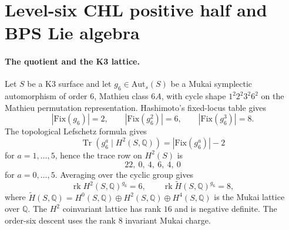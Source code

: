 \providecommand{\bC}{\mathbb{C}}
\providecommand{\bZ}{\mathbb{Z}}
\providecommand{\bQ}{\mathbb{Q}}
\providecommand{\Aut}{\mathrm{Aut}}
\providecommand{\Auts}{\mathrm{Aut}_s}
\providecommand{\Fix}{\mathrm{Fix}}
\providecommand{\CoHA}{\mathrm{CoHA}}
\providecommand{\Coh}{\mathrm{Coh}}
\providecommand{\DT}{\mathrm{DT}}
\providecommand{\red}{\mathrm{red}}
\providecommand{\BPS}{\mathrm{BPS}}
\providecommand{\eff}{\mathrm{eff}}
\providecommand{\cO}{\mathcal{O}}
\providecommand{\cA}{\mathcal{A}}
\providecommand{\cM}{\mathcal{M}}
\providecommand{\fg}{\mathfrak{g}}
\providecommand{\fn}{\mathfrak{n}}
\providecommand{\Teq}{T_{\mathrm{eq}}}
\providecommand{\Eone}{E_1}
\providecommand{\Etwo}{E_2}
\providecommand{\Yp}{Y^{+}}
\providecommand{\DTred}{Z^{\mathrm{red}}_{\mathrm{DT}}}
\providecommand{\Hall}{\mathrm{Hall}}
\providecommand{\wt}{\mathrm{wt}}
\providecommand{\sdim}{\operatorname{sdim}}
\providecommand{\kch}{\kappa_{\mathrm{ch}}}
\providecommand{\kBKM}{\kappa_{\mathrm{BKM}}}
\providecommand{\kcat}{\kappa_{\mathrm{cat}}}
\providecommand{\kfib}{\kappa_{\mathrm{fiber}}}
\providecommand{\DeltaCHLSix}{\Delta_{1}^{(6)}}

\section*{Level-six CHL positive half and BPS Lie algebra}
\label{n6:sec:positive-half-BPS}

\paragraph{The quotient and the K3 lattice.}
Let $S$ be a K3 surface and let
$g_6\in\Auts(S)$ be a Mukai symplectic automorphism of order $6$,
Mathieu class $6A$, with cycle shape $1^2 2^2 3^2 6^2$ on the
Mathieu permutation representation. Hashimoto's fixed-locus table gives
\[
  |\Fix(g_6)|=2,\qquad
  |\Fix(g_6^2)|=6,\qquad
  |\Fix(g_6^3)|=8 .
\]
The topological Lefschetz formula gives
\[
  \operatorname{Tr}(g_6^a\mid H^2(S,\bQ))
  =
  |\Fix(g_6^a)|-2
\]
for $a=1,\ldots,5$, hence the trace row on $H^2(S)$ is
\[
  22,\ 0,\ 4,\ 6,\ 4,\ 0
\]
for $a=0,\ldots,5$. Averaging over the cyclic group gives
\[
  \operatorname{rk}H^2(S,\bQ)^{g_6}=6,\qquad
  \operatorname{rk}\widetilde H(S,\bQ)^{g_6}=8,
\]
where $\widetilde H(S,\bQ)=H^0(S,\bQ)\oplus H^2(S,\bQ)\oplus H^4(S,\bQ)$
is the Mukai lattice over $\bQ$. The $H^2$ coinvariant lattice has rank
$16$ and is negative definite. The order-six descent uses the rank $8$
invariant Mukai charge.

